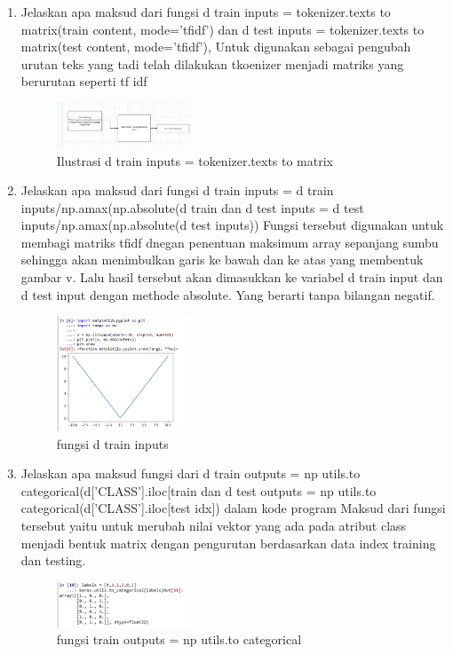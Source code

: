 \begin{enumerate}
	\item Jelaskan apa maksud dari fungsi d train inputs = tokenizer.texts to matrix(train content, mode=’tﬁdf’) dan d test inputs = tokenizer.texts to matrix(test content, mode=’tﬁdf’), 
	\hfill\break
	Untuk digunakan sebagai pengubah urutan teks yang tadi telah dilakukan tkoenizer menjadi matriks yang berurutan seperti tf idf
	\begin{figure}[H]
	    \centering
	    \includegraphics[width=4cm]{figures/1174096/tugas7/teori_6.PNG}
	    \caption{Ilustrasi d train inputs = tokenizer.texts to matrix}
    \end{figure}

    \item  Jelaskan apa maksud dari fungsi d train inputs = d train inputs/np.amax(np.absolute(d train dan d test inputs = d test inputs/np.amax(np.absolute(d test inputs))
    \hfill\break
    Fungsi tersebut digunakan untuk membagi matriks tfidf dnegan penentuan maksimum array sepanjang sumbu sehingga akan menimbulkan garis ke bawah dan ke atas yang membentuk gambar v. Lalu hasil tersebut akan dimasukkan ke variabel d train input dan d test input dengan methode absolute. Yang berarti tanpa bilangan negatif.
    \begin{figure}[H]
	    \centering
	    \includegraphics[width=4cm]{figures/1174096/tugas7/teori_7.PNG}
	    \caption{fungsi d train inputs}
    \end{figure}

    \item Jelaskan apa maksud fungsi dari d train outputs = np utils.to categorical(d[’CLASS’].iloc[train dan d test outputs = np utils.to categorical(d[’CLASS’].iloc[test idx]) dalam kode program
    \hfill\break
    Maksud dari fungsi tersebut yaitu untuk merubah nilai vektor yang ada pada atribut class menjadi bentuk matrix dengan pengurutan berdasarkan data index training dan testing.
    \begin{figure}[H]
	    \centering
	    \includegraphics[width=4cm]{figures/1174096/tugas7/teori_8.PNG}
	    \caption{fungsi train outputs = np utils.to categorical}
    \end{figure}


\end{enumerate}

